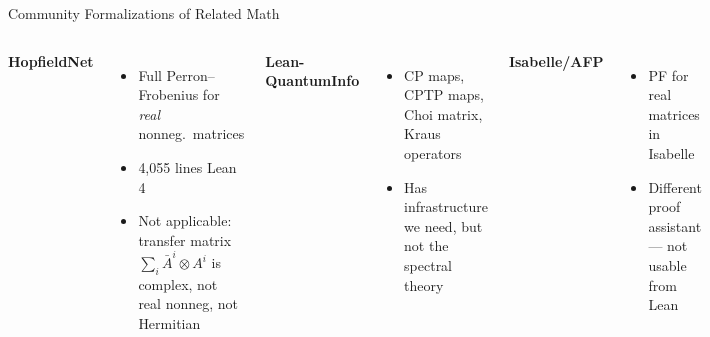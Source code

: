 \documentclass[aspectratio=169,10pt]{beamer}
\begin{document}
\begin{frame}{Community Formalizations of Related Math}
    \vspace{-0.3em}
    \begin{columns}[T]
        \textbf{\textcolor{leanblue}{HopfieldNet} \cite{Cipollina2025Formalized}}
        \begin{itemize}\itemsep0.12em\small
            \item Full Perron--Frobenius for \emph{real} nonneg.\ matrices
            \item 4,055 lines Lean 4
            \item \textcolor{softred}{Not applicable}: transfer matrix $\sum_i \bar{A}^i\otimes A^i$ is complex, not real nonneg, not Hermitian
        \end{itemize}

        \vspace{0.4em}
        \textbf{\textcolor{leanblue}{Lean-QuantumInfo} \cite{Meiburg2025Formalization}}
        \begin{itemize}\itemsep0.12em\small
            \item CP maps, CPTP maps, Choi matrix, Kraus operators
            \item Has infrastructure we need, but not the spectral theory
        \end{itemize}

        \textbf{\textcolor{leanblue}{Isabelle/AFP}}
        \begin{itemize}\itemsep0.12em\small
            \item PF for real matrices in Isabelle
            \item Different proof assistant --- not usable from Lean
        \end{itemize}

        \vspace{0.4em}
        \begin{center}
        \end{center}
    \end{columns}
\end{frame}
\end{document}

